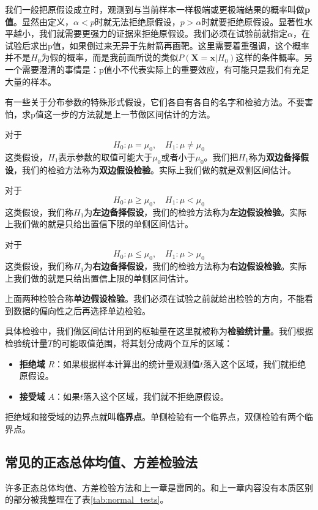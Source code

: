 我们一般把原假设成立时，观测到与当前样本一样极端或更极端结果的概率叫做\textbf{p值}。显然由定义，$\alpha <p$时就无法拒绝原假设，$p >\alpha$时就要拒绝原假设。显著性水平越小，我们就需要更强力的证据来拒绝原假设。我们必须在试验前就指定$\alpha$，在试验后求出p值，如果倒过来无异于先射箭再画靶。这里需要着重强调，这个概率并不是$H_0$为假的概率，而是我前面所说的类似$P(\mathbf{X}=\mathbf{x}|H_0)$这样的条件概率。另一个需要澄清的事情是：p值小不代表实际上的重要效应，有可能只是我们有充足大量的样本。

有一些关于分布参数的特殊形式假设，它们各自有各自的名字和检验方法。不要害怕，求p值这一步的方法就是上一节做区间估计的方法。

对于
\[H_0:\mu=\mu_0,\quad H_1:\mu\neq\mu_0\]
这类假设，$H_1$表示参数的取值可能大于$\mu_0$或者小于$\mu_0$。我们把$H_1$称为\textbf{双边备择假设}，我们的检验方法称为\textbf{双边假设检验}。实际上我们做的就是双侧区间估计。

对于
\[H_0:\mu \geq \mu_0,\quad H_1:\mu<\mu_0\]
这类假设，我们称$H_1$为\textbf{左边备择假设}，我们的检验方法称为\textbf{左边假设检验}。实际上我们做的就是只给出置信\textbf{下}限的单侧区间估计。

对于
\[H_0:\mu \leq \mu_0,\quad H_1:\mu>\mu_0\]
这类假设，我们称$H_1$为\textbf{右边备择假设}，我们的检验方法称为\textbf{右边假设检验}。实际上我们做的就是只给出置信\textbf{上}限的单侧区间估计。

上面两种检验合称\textbf{单边假设检验}。我们必须在试验之前就给出检验的方向，不能看到数据的偏向性之后再选择单边检验。

具体检验中，我们做区间估计用到的枢轴量在这里就被称为\textbf{检验统计量}。我们根据检验统计量$T$的可能取值范围，将其划分成两个互斥的区域：

\begin{itemize}
    \item \textbf{拒绝域} $R$：如果根据样本计算出的统计量观测值$t$落入这个区域，我们就拒绝原假设。
    \item \textbf{接受域} $A$：如果$t$落入这个区域，我们就不拒绝原假设。
\end{itemize}

拒绝域和接受域的边界点就叫\textbf{临界点}。单侧检验有一个临界点，双侧检验有两个临界点。

\subsection{常见的正态总体均值、方差检验法}
许多正态总体均值、方差检验方法和上一章是雷同的。和上一章内容没有本质区别的部分被我整理在了表\ref{tab:normal_tests}。

